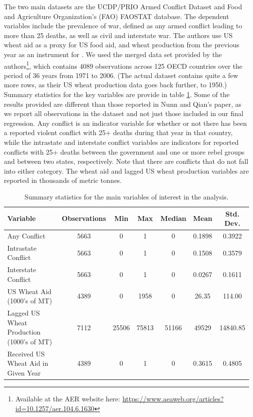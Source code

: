 \documentclass{article}
\begin{document}
The two main datasets are the UCDP/PRIO Armed Conflict Dataset and Food and Agriculture Organization’s (FAO) FAOSTAT database. The dependent variables include the prevalence of war, defined as any armed conflict leading to more than 25 deaths, as well as civil and interstate war. The authors use US wheat aid as a proxy for US food aid, and wheat production from the previous year as an instrument for . We used the merged data set provided by the authors\footnote{Available at the AER website here: \href{https://www.aeaweb.org/articles?id=10.1257/aer.104.6.1630}{https://www.aeaweb.org/articles?id=10.1257/aer.104.6.1630}}, which contains 4089 observations across 125 OECD countries over the period of 36 years from 1971 to 2006. (The actual dataset contains quite a few more rows, as their US wheat production data goes back further, to 1950.) \\

Summary statistics for the key variables are provide in table \ref{summary}. Some of the results provided are different than those reported in Nunn and Qian's paper, as we report all observations in the dataset and not just those included in our final regression. Any conflict is an indicator variable for whether or not there has been a reported violent conflict with 25+ deaths during that year in that country, while the intrastate and interstate conflict variables are indicators for reported conflicts with 25+ deaths between the government and one or more rebel groups and between two states, respectively. Note that there are conflicts that do not fall into either category. The wheat aid and lagged US wheat production variables are reported in thousands of metric tonnes. \\

\begin{table}[t]
\centering
\begin{tabular}{| l | c | c | c | c | c | c | }
\hline
Variable & Observations & Min & Max & Median & Mean & Std. Dev.\\
\hline
Any Conflict & 5663 & 0 & 1 & 0 & 0.1898 & 0.3922 \\
Intrastate Conflict & 5663 & 0 & 1 & 0 & 0.1508 & 0.3579\\
Interstate Conflict & 5663 & 0 & 1 & 0 & 0.0267 & 0.1611\\
\hline
US Wheat Aid (1000's of MT) & 4389 & 0 & 1958 & 0 & 26.35 & 114.00\\
Lagged US Wheat Production (1000's of MT) & 7112 & 25506 & 75813   & 51166 & 49529 & 14840.85\\
Received US Wheat Aid in Given Year &4389 &  0 & 1 & 0 & 0.3615 & 0.4805\\
\hline 
\end{tabular}
\label{summary}
\caption{Summary statistics for the main variables of interest in the analysis. }
\end{table}
\end{document}
